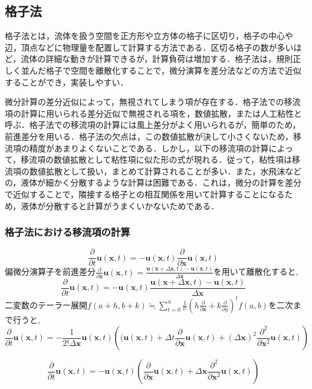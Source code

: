 \documentclass[a4j,12pt]{jreport}
\begin{document}
\subsection{格子法} \label{subsec:grid}
格子法とは，流体を扱う空間を正方形や立方体の格子に区切り，格子の中心や辺，頂点などに物理量を配置して計算する方法である．区切る格子の数が多いほど，流体の詳細な動きが計算できるが，計算負荷は増加する．格子法は，規則正しく並んだ格子で空間を離散化することで，微分演算を差分法などの方法で近似することができ，実装しやすい．

微分計算の差分近似によって，無視されてしまう項が存在する．格子法での移流項の計算に用いられる差分近似で無視される項を，数値拡散，または人工粘性と呼ぶ．格子法での移流項の計算には風上差分がよく用いられるが，簡単のため，前進差分を用いる．格子法の欠点は，この数値拡散が決して小さくないため，移流項の精度があまりよくないことである．しかし，以下の移流項の計算によって，移流項の数値拡散として粘性項に似た形の式が現れる．従って，粘性項は移流項の数値拡散として扱い，まとめて計算されることが多い．また，水飛沫などの，液体が細かく分散するような計算は困難である．これは，微分の計算を差分で近似することで，隣接する格子との相互関係を用いて計算することになるため，液体が分散すると計算がうまくいかないためである．

\subsubsection{格子法における移流項の計算} \label{subsec:gridadvect}
$$\frac{\partial}{\partial t}\bm{u} (\bm{x},t)  = -\bm{u} (\bm{x},t) \frac{\partial}{\partial \bm{x}}\bm{u} (\bm{x},t) $$
偏微分演算子を前進差分$\frac{\partial}{\partial \bm{x}}\bm{u} (\bm{x},t)  = \frac{\bm{u} (\bm{x}+\varDelta \bm{x},t)  - \bm{u} (\bm{x},t) }{\varDelta \bm{x}}$を用いて離散化すると,
$$\frac{\partial}{\partial t}\bm{u} (\bm{x},t)  =  -\bm{u} (\bm{x},t) \frac{\bm{u} (\bm{x}+\varDelta \bm{x},t)  - \bm{u} (\bm{x},t) }{\varDelta \bm{x}}$$
二変数のテーラー展開$f (a+h,b+k)  \fallingdotseq \sum\limits_{t=0}^n \frac{1}{t!} (h\frac{\partial}{\partial \bm{x}} + k\frac{\partial}{\partial y}) ^t f (a,b) $を二次まで行うと,
$$\frac{\partial}{\partial t}\bm{u} (\bm{x},t)  = -\frac{1}{2!\varDelta \bm{x}}\bm{u} (\bm{x},t) \left (  (\bm{u} (\bm{x},t) +\varDelta t\frac{\partial}{\partial \bm{x}}\bm{u} (\bm{x},t)  +  (\varDelta \bm{x}) ^2\frac{\partial^2}{\partial \bm{x}^2}\bm{u} (\bm{x},t)  \right) $$
            
$$\frac{\partial}{\partial t}\bm{u} (\bm{x},t)  =  -\bm{u} (\bm{x},t) \left (\frac{\partial}{\partial \bm{x}}\bm{u} (\bm{x},t)  + \varDelta \bm{x}\frac{\partial^2}{\partial \bm{x}^2}\bm{u} (\bm{x},t)  \right) $$
\end{document}
